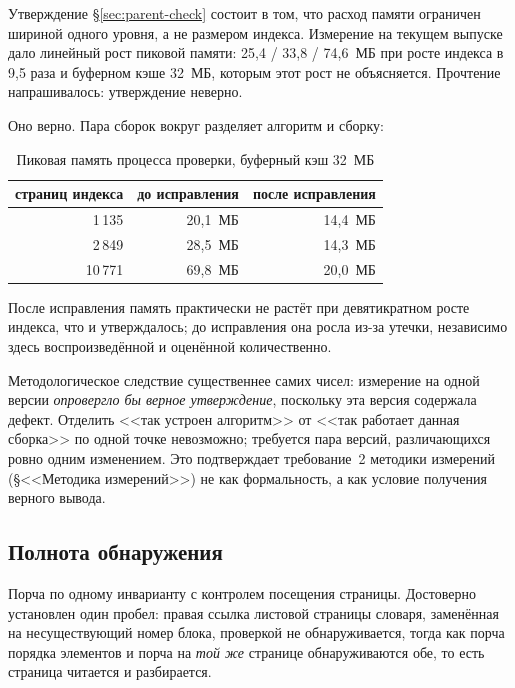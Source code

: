Утверждение §\ref{sec:parent-check} состоит в том, что расход памяти ограничен
шириной одного уровня, а не размером индекса. Измерение на текущем выпуске дало
линейный рост пиковой памяти: 25,4 / 33,8 / 74,6~МБ при росте индекса в 9,5
раза и буферном кэше 32~МБ, которым этот рост не объясняется. Прочтение
напрашивалось: утверждение неверно.

Оно верно. Пара сборок вокруг  разделяет алгоритм и сборку:

\begin{table}[htbp]
\centering
\caption{Пиковая память процесса проверки, буферный кэш 32~МБ}
\label{tab:amcheck-mem}
\begin{tabular}{rrr}
\toprule
страниц индекса & до исправления & после исправления \\
\midrule
1\,135 & 20,1~МБ & 14,4~МБ \\
2\,849 & 28,5~МБ & 14,3~МБ \\
10\,771 & 69,8~МБ & 20,0~МБ \\
\bottomrule
\end{tabular}
\end{table}

После исправления память практически не растёт при девятикратном росте индекса,
что и утверждалось; до исправления она росла из-за утечки, независимо здесь
воспроизведённой и оценённой количественно.

Методологическое следствие существеннее самих чисел: измерение на одной версии
\emph{опровергло бы верное утверждение}, поскольку эта версия содержала дефект.
Отделить <<так устроен алгоритм>> от <<так работает данная сборка>> по одной
точке невозможно; требуется пара версий, различающихся ровно одним изменением.
Это подтверждает требование~2 методики измерений (§<<Методика измерений>>) не
как формальность, а как условие получения верного вывода.

\subsection{Полнота обнаружения}

Порча по одному инварианту с контролем посещения страницы. Достоверно
установлен один пробел: правая ссылка листовой страницы словаря, заменённая на
несуществующий номер блока, проверкой не обнаруживается, тогда как порча порядка
элементов и порча  на \emph{той же} странице обнаруживаются обе,
то есть страница читается и разбирается.

